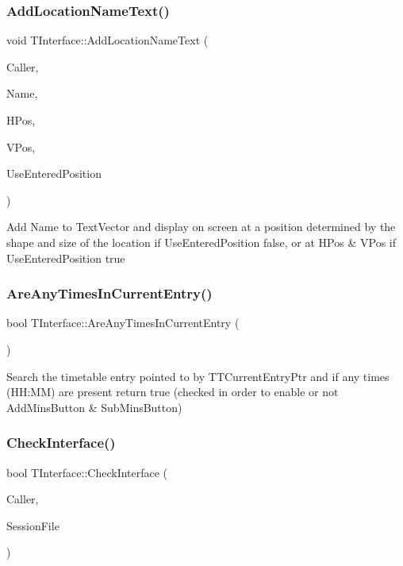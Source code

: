 \subsubsection{\texorpdfstring{Add\+Location\+Name\+Text()}{AddLocationNameText()}}
{\footnotesize\ttfamily void T\+Interface\+::\+Add\+Location\+Name\+Text (\begin{DoxyParamCaption}\item[{int}]{Caller,  }\item[{Ansi\+String}]{Name,  }\item[{int}]{H\+Pos,  }\item[{int}]{V\+Pos,  }\item[{bool}]{Use\+Entered\+Position }\end{DoxyParamCaption})\hspace{0.3cm}{\ttfamily [private]}}

Add \textquotesingle{}Name\textquotesingle{} to Text\+Vector and display on screen at a position determined by the shape and size of the location if Use\+Entered\+Position false, or at H\+Pos \& V\+Pos if Use\+Entered\+Position true \mbox{\label{class_t_interface_acb0a5b4f8362e75bb7b34d981e4783d9}} 
\subsubsection{\texorpdfstring{Are\+Any\+Times\+In\+Current\+Entry()}{AreAnyTimesInCurrentEntry()}}
{\footnotesize\ttfamily bool T\+Interface\+::\+Are\+Any\+Times\+In\+Current\+Entry (\begin{DoxyParamCaption}{ }\end{DoxyParamCaption})\hspace{0.3cm}{\ttfamily [private]}}

Search the timetable entry pointed to by T\+T\+Current\+Entry\+Ptr and if any times (HH\+:MM) are present return true (checked in order to enable or not Add\+Mins\+Button \& Sub\+Mins\+Button) \mbox{\label{class_t_interface_ae484cb4ac3ce536b922fff402e6689f7}} 
\subsubsection{\texorpdfstring{Check\+Interface()}{CheckInterface()}}
{\footnotesize\ttfamily bool T\+Interface\+::\+Check\+Interface (\begin{DoxyParamCaption}\item[{int}]{Caller,  }\item[{std\+::ifstream \&}]{Session\+File }\end{DoxyParamCaption})\hspace{0.3cm}{\ttfamily [private]}}

